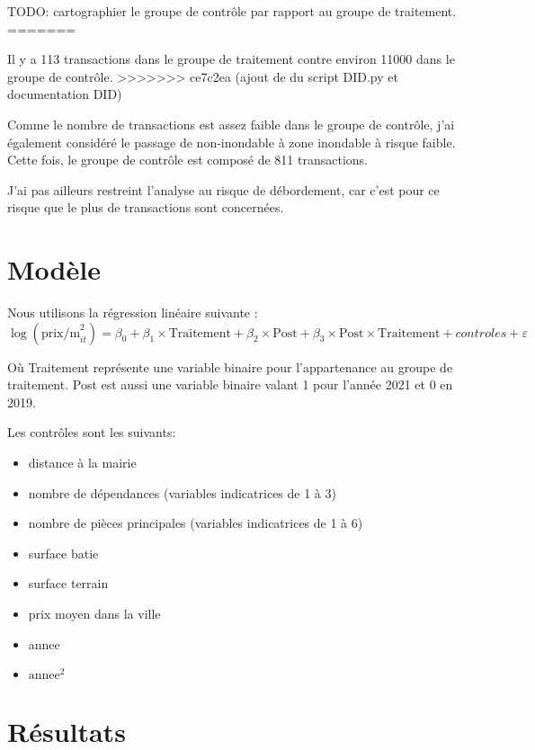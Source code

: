 \documentclass[a4paper,12pt]{article}
\begin{document}
TODO: cartographier le groupe de contrôle par rapport au groupe de traitement. 
=======


Il y a 113 transactions dans le groupe de traitement contre environ 11000 dans le groupe de contrôle.\newline
>>>>>>> ce7c2ea (ajout de du script DID.py et documentation DID)

Comme le nombre de transactions est assez faible dans le groupe de contrôle, j'ai également considéré le passage de non-inondable à zone inondable à risque faible. Cette fois, le groupe de contrôle est composé de 811 transactions. \newline

J'ai pas ailleurs restreint l'analyse au risque de débordement, car c'est pour ce risque que le plus de transactions sont concernées. \newline


\section{Modèle}
Nous utilisons la régression linéaire suivante :
\begin{equation}
	\log(\text{prix/m}^2_{it}) = \beta_0 + \beta_1 \times \text{Traitement} + \beta_2 \times \text{Post} + \beta_3 \times \text{Post} \times \text{Traitement} + controles + \varepsilon
\end{equation}

Où Traitement représente une variable binaire pour l'appartenance au groupe de traitement. Post est aussi une variable binaire valant 1 pour l'année 2021 et 0 en 2019. \newline

Les contrôles sont les suivants:
\begin{itemize}
\item distance à la mairie
\item nombre de dépendances (variables indicatrices de 1 à 3)
\item nombre de pièces principales (variables indicatrices de 1 à 6)
\item surface batie
\item surface terrain
\item prix moyen dans la ville
\item annee
\item \( \text{annee}^2 \)
\end{itemize}

\section{Résultats}
\end{document}
